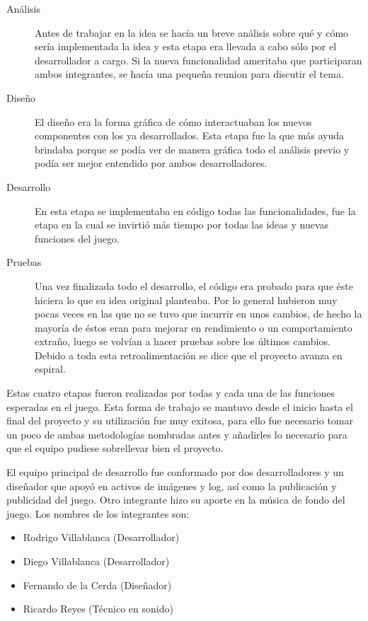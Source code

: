 \documentclass[a4paper,12pt,openany,oneside]{book}
\begin{document}
\begin{description}
\item[Análisis] Antes de trabajar en la idea se hacía un breve análisis sobre qué y cómo sería implementada la idea y esta etapa era llevada a cabo sólo por el desarrollador a cargo. Si la nueva funcionalidad ameritaba que participaran ambos integrantes, se hacía una pequeña reunion para discutir el tema.
\item[Diseño] El diseño era la forma gráfica de cómo interactuaban los nuevos componentes con los ya desarrollados. Esta etapa fue la que más ayuda brindaba porque se podía ver de manera gráfica todo el análisis previo y podía ser mejor entendido por ambos desarrolladores.
\item[Desarrollo] En esta etapa se implementaba en código todas las funcionalidades, fue la etapa en la cual se invirtió más tiempo por todas las ideas y nuevas funciones del juego.
\item[Pruebas] Una vez finalizada todo el desarrollo, el código era probado para que éste hiciera lo que su idea original planteaba. Por lo general hubieron muy pocas veces en las que no se tuvo que incurrir en unos cambios, de hecho la mayoría de éstos eran para mejorar en rendimiento o un comportamiento extraño, luego se volvían a hacer pruebas sobre los últimos cambios. Debido a toda esta retroalimentación se dice que el proyecto avanza en espiral.
\end{description}
Estas cuatro etapas fueron realizadas por todas y cada una de las funciones esperadas en el juego. Esta forma de trabajo se mantuvo desde el inicio hasta el final del proyecto y su utilización fue muy exitosa, para ello fue necesario tomar un poco de ambas metodologías nombradas antes y añadirles lo necesario para que el equipo pudiese sobrellevar bien el proyecto.

El equipo principal de desarrollo fue conformado por dos desarrolladores y un diseñador que apoyó en activos de imágenes y log, así como la publicación y publicidad del juego. Otro integrante hizo su aporte en la música de fondo del juego.
Los nombres de los integrantes son:
\begin{itemize}
\item Rodrigo Villablanca (Desarrollador)
\item Diego Villablanca (Desarrollador)
\item Fernando de la Cerda (Diseñador)
\item Ricardo Reyes (Técnico en sonido)
\end{itemize}
\end{document}
